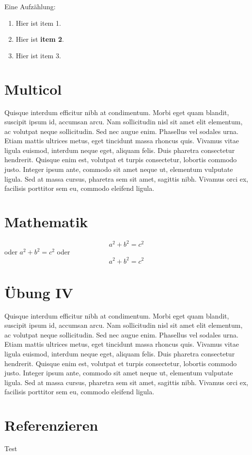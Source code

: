 Eine Aufzählung:
\begin{enumerate}
	\item Hier ist item 1.
	\item Hier ist \textbf{item 2}.
	\item Hier ist item 3.
\end{enumerate}

\newpage
\section{Multicol}
\begin{multicols}{2}
	Quisque interdum efficitur nibh at condimentum. Morbi eget quam blandit, suscipit ipsum id, accumsan arcu. Nam sollicitudin nisl sit amet elit elementum, ac volutpat neque sollicitudin. Sed nec augue enim. Phasellus vel sodales urna. Etiam mattis ultrices metus, eget tincidunt massa rhoncus quis. Vivamus vitae ligula euismod, interdum neque eget, aliquam felis. Duis pharetra consectetur hendrerit. Quisque enim est, volutpat et turpis consectetur, lobortis commodo justo. Integer ipsum ante, commodo sit amet neque ut, elementum vulputate ligula. Sed at massa cursus, pharetra sem sit amet, sagittis nibh. Vivamus orci ex, facilisis porttitor sem eu, commodo eleifend ligula.
\end{multicols}

\section{Mathematik}
\begin{equation}
	a^{2}+b^{2}=c^{2}
	\label{gleichung:Pytagoras}
\end{equation}
oder
$a^{2}+b^{2}=c^{2}$ oder
$$a^{2}+b^{2}=c^{2}$$

\section{Übung IV}
\begin{multicols}{3}
	Quisque interdum efficitur nibh at condimentum. Morbi eget quam blandit, suscipit ipsum id, accumsan arcu. Nam sollicitudin nisl sit amet elit elementum, ac volutpat neque sollicitudin. Sed nec augue enim. Phasellus vel sodales urna. Etiam mattis ultrices metus, eget tincidunt massa rhoncus quis. Vivamus vitae ligula euismod, interdum neque eget, aliquam felis. Duis pharetra consectetur hendrerit. Quisque enim est, volutpat et turpis consectetur, lobortis commodo justo. Integer ipsum ante, commodo sit amet neque ut, elementum vulputate ligula. Sed at massa cursus, pharetra sem sit amet, sagittis nibh. Vivamus orci ex, facilisis porttitor sem eu, commodo eleifend ligula.
\end{multicols}

\tableofcontents
\listoffigures
\listoftables

\section{Referenzieren}\label{sec:ref}
Test \cite{Kleiner.2022}


\printbibliography


